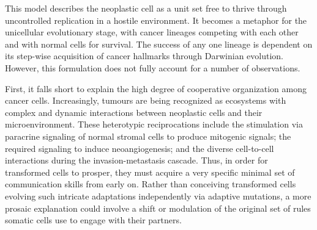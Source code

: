 This model describes the neoplastic cell as a unit set free to thrive
through uncontrolled replication in a hostile environment.  It becomes
a metaphor for the unicellular evolutionary stage, with cancer
lineages competing with each other and with normal cells for
survival.\cite{merlo_cancer_2006} The success of any one lineage is
dependent on its \mbox{step-wise} acquisition of cancer hallmarks
through Darwinian evolution.  However, this formulation does not fully
account for a number of observations.\cite{davies_cancer_2011}

First, it falls short to explain the high degree of cooperative organization
among cancer cells.  Increasingly, tumours are being recognized as ecosystems
with complex and dynamic interactions between neoplastic cells and their
microenvironment.\cite{polyak_co-evolution_2009} These heterotypic
reciprocations include the stimulation via paracrine signaling of normal stromal
cells to produce mitogenic signals; the required signaling to induce
neoangiogenesis; and the diverse cell-to-cell interactions during the
invasion-metastasis cascade.\cite{axelrod_evolution_2006} Thus, in order for
transformed cells to prosper, they must acquire a very specific minimal set of
communication skills from early on.  Rather than conceiving transformed cells
evolving such intricate adaptations independently via adaptive mutations, a more
prosaic explanation could involve a shift or modulation of the original set of
rules somatic cells use to engage with their partners.


